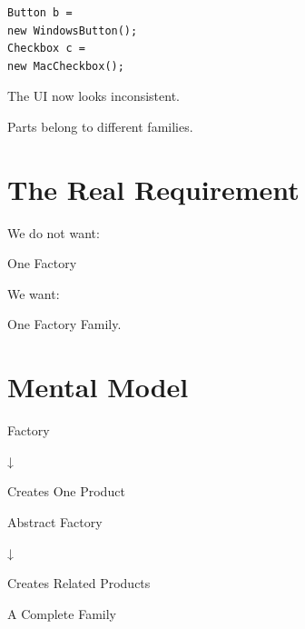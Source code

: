 \documentclass[11pt,a4paper]{book}
\begin{document}
\begin{verbatim}
Button b =
new WindowsButton();
Checkbox c =
new MacCheckbox();
\end{verbatim}


The UI now looks inconsistent.


Parts belong to different
families.


\section{The Real Requirement}

We do not want:


One Factory


We want:


One Factory Family.


\section{Mental Model}

\begin{mentalmodel}

Factory

↓

Creates One Product

\vspace{0.5em}

Abstract Factory

↓

Creates Related Products

\vspace{0.5em}

A Complete Family

\end{mentalmodel}
\end{document}
